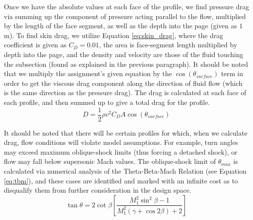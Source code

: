 \documentclass[11pt]{article}
\begin{document}
Once we have the absolute values at each face of the profile, we find pressure drag via summing up the component of pressure acting parallel to the flow, multiplied by the length of the face segment, as well as the depth into the page (given as $1$ m). To find skin drag, we utilize Equation \ref{eq:skin_drag}, where the drag coefficient is given as $C_D=0.01$, the area is face-segment length multiplied by depth into the page, and the density and velocity are those of the fluid touching the subsection (found as explained in the previous paragraph). It should be noted that we multiply the assignment's given equation by the $\cos(\theta_{surface})$ term in order to get the viscous drag component along the direction of fluid flow (which is the same direction as the pressure drag). The drag is calculated at each face of each profile, and then summed up to give a total drag for the profile.
\begin{equation}
    D=\frac{1}{2} \rho v^2 C_D A \cos(\theta_{surface})
    \label{eq:skin_drag}
\end{equation} 

It should be noted that there will be certain profiles for which, when we calculate drag, flow conditions will violate model assumptions. For example, turn angles may exceed maximum oblique-shock limits (thus forcing a detached shock), or flow may fall below supersonic Mach values. The oblique-shock limit of $\theta_{max}$ is calculated via numerical analysis of the Theta-Beta-Mach Relation (see Equation \ref{eq:tbm}), and these cases are identified and marked with an infinite cost as to disqualify them from further consideration in the design space.
\begin{equation}
\tan \theta = 2 \cot \beta 
\left[
\frac{M_1^2 \sin^2 \beta - 1}
     {M_1^2 (\gamma + \cos 2\beta) + 2}
\right]
\label{eq:tbm}
\end{equation}
\end{document}
